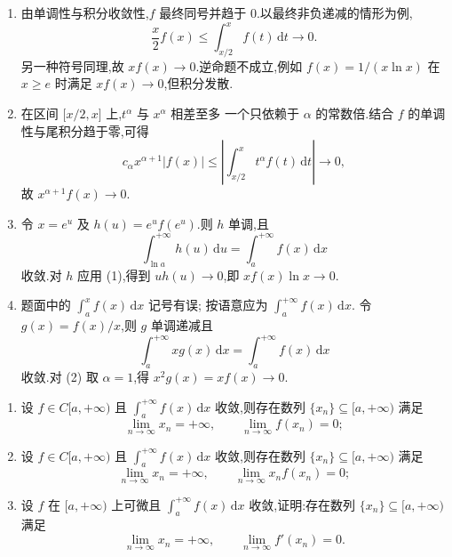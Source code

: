 \begin{solution}
  \leavevmode
  \begin{enumerate}
    \item 由单调性与积分收敛性,$f$ 最终同号并趋于 $0$.以最终非负递减的情形为例,
          \[
            \dfrac{x}{2}f(x)\leq\int_{x/2}^xf(t)\,\mathrm{d}t\longrightarrow0.
          \]
          另一种符号同理,故 $xf(x)\to0$.逆命题不成立,例如
          $f(x)=1/(x\ln x)$ 在 $x\geq e$ 时满足 $xf(x)\to0$,但积分发散.

    \item 在区间 $\lbrack x/2,x\rbrack$ 上,$t^\alpha$ 与 $x^\alpha$ 相差至多
          一个只依赖于 $\alpha$ 的常数倍.结合 $f$ 的单调性与尾积分趋于零,可得
          \[
            c_\alpha x^{\alpha+1}|f(x)|
            \leq\left|\int_{x/2}^xt^\alpha f(t)\,\mathrm{d}t\right|\longrightarrow0,
          \]
          故 $x^{\alpha+1}f(x)\to0$.

    \item 令 $x=e^u$ 及 $h(u)=e^u f(e^u)$.则 $h$ 单调,且
          \[
            \displaystyle\int_{\ln a}^{+\infty}h(u)\,\mathrm{d}u
            =\int_a^{+\infty}f(x)\,\mathrm{d}x
          \]
          收敛.对 $h$ 应用 (1),得到 $u h(u)\to0$,即
          $xf(x)\ln x\to0$.

    \item 题面中的 $\displaystyle\int_a^x f(x)\,\mathrm{d}x$ 记号有误;
          按语意应为 $\displaystyle\int_a^{+\infty}f(x)\,\mathrm{d}x$.
          令 $g(x)=f(x)/x$,则 $g$ 单调递减且
          \[
            \displaystyle\int_a^{+\infty}xg(x)\,\mathrm{d}x
            =\int_a^{+\infty}f(x)\,\mathrm{d}x
          \]
          收敛.对 (2) 取 $\alpha=1$,得 $x^2g(x)=xf(x)\to0$.
  \end{enumerate}
\end{solution}

\begin{example}
  \begin{enumerate}
    \item 设 $f\in C\lbrack a,+\infty)$ 且 $\displaystyle\int_a^{+\infty}f(x)\,\mathrm{d}x$ 收敛,则存在数列 $\{x_n\}\subseteq\lbrack a,+\infty)$ 满足
          \[
            \displaystyle\lim\limits_{n\to\infty}x_n=+\infty,
            \qquad
            \lim\limits_{n\to\infty}f(x_n)=0;
          \]
    \item 设 $f\in C\lbrack a,+\infty)$ 且 $\displaystyle\int_a^{+\infty}f(x)\,\mathrm{d}x$ 收敛,则存在数列 $\{x_n\}\subseteq\lbrack a,+\infty)$ 满足
          \[
            \displaystyle\lim\limits_{n\to\infty}x_n=+\infty,
            \qquad
            \lim\limits_{n\to\infty}x_nf(x_n)=0;
          \]
    \item 设 $f$ 在 $\lbrack a,+\infty)$ 上可微且 $\displaystyle\int_a^{+\infty}f(x)\,\mathrm{d}x$ 收敛,证明:存在数列 $\{x_n\}\subseteq\lbrack a,+\infty)$ 满足
          \[
            \displaystyle\lim\limits_{n\to\infty}x_n=+\infty,
            \qquad
            \lim\limits_{n\to\infty}f'(x_n)=0.
          \]
  \end{enumerate}
\end{example}
\exampleblank

